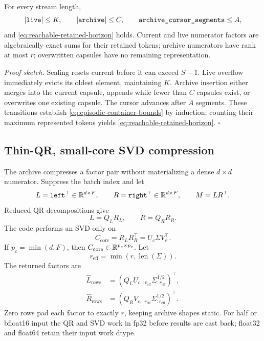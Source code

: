 \begin{proposition}
\label{prop:bounded-episodic-lifecycle}
For every stream length,
\begin{equation}
  \left\lvert \texttt{live}\right\rvert\leq K,\qquad
  \left\lvert \texttt{archive}\right\rvert\leq C,\qquad
  \texttt{archive\_cursor\_segments}\leq A,
  \label{eq:episodic-container-bounds}
\end{equation}
and \eqref{eq:reachable-retained-horizon} holds.  Current and live numerator
factors are algebraically exact sums for their retained tokens; archive
numerators have rank at most \(r\); overwritten capsules have no remaining
representation.
\end{proposition}
\noindent\emph{Proof sketch.}
Sealing resets current before it can exceed \(S-1\).  Live overflow immediately
evicts its oldest element, maintaining \(K\).  Archive insertion either merges
into the current capsule, appends while fewer than \(C\) capsules exist, or
overwrites one existing capsule.  The cursor advances after \(A\) segments.
These transitions establish \eqref{eq:episodic-container-bounds} by induction;
counting their maximum represented tokens yields
\eqref{eq:reachable-retained-horizon}. \hfill\(\square\)

\subsection{Thin-QR, small-core SVD compression}
\label{subsec:small-core-svd}

The archive compresses a factor pair without materializing a dense
\(d\times d\) numerator.  Suppress the batch index and let
\begin{equation}
  L=\texttt{left}^{\top}\in\mathbb{R}^{d\times F},
  \qquad
  R=\texttt{right}^{\top}\in\mathbb{R}^{d\times F},
  \qquad
  M=LR^\top.
  \label{eq:compression-input}
\end{equation}
Reduced QR decompositions give
\begin{equation}
  L=Q_LR_L,\qquad
  R=Q_RR_R.
\end{equation}
The code performs an SVD only on
\begin{equation}
  C_{\mathrm{core}}
  =
  R_LR_R^\top
  =
  U_c\Sigma V_c^\top.
  \label{eq:small-core}
\end{equation}
If \(p_c=\min(d,F)\), then \(C_{\mathrm{core}}\in\mathbb{R}^{p_c\times p_c}\).
Let
\begin{equation}
  r_{\mathrm{eff}}
  =
  \min(r,\operatorname{len}(\Sigma)).
\end{equation}
The returned factors are
\begin{align}
  \widehat L_{\mathrm{rows}}
    &=
    \left(
      Q_LU_{c,:r_{\mathrm{eff}}}
      \Sigma_{:r_{\mathrm{eff}}}^{1/2}
    \right)^\top, \\
  \widehat R_{\mathrm{rows}}
    &=
    \left(
      Q_RV_{c,:r_{\mathrm{eff}}}
      \Sigma_{:r_{\mathrm{eff}}}^{1/2}
    \right)^\top.
  \label{eq:compressed-factors}
\end{align}
Zero rows pad each factor to exactly \(r\), keeping archive shapes static.
For half or bfloat16 input the QR and SVD work in fp32 before results are cast
back; float32 and float64 retain their input work dtype.


